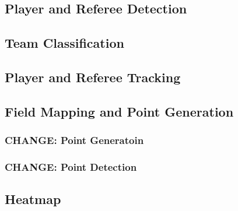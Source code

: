 \documentclass[12pt, letterpaper]{article}
\begin{document}
{
\setlength{\parskip}{0.3cm}
\subsection{Player and Referee Detection}
\begin{spacing}{1.2}

\end{spacing}
}

{
\setlength{\parskip}{0.3cm}
\subsection{Team Classification}
\begin{spacing}{1.2}

\end{spacing}
}

{
\setlength{\parskip}{0.3cm}
\subsection{Player and Referee Tracking}
\begin{spacing}{1.2}

\end{spacing}
}

{
\setlength{\parskip}{0.3cm}
\subsection{Field Mapping and Point Generation}
\begin{spacing}{1.2}

\subsubsection{\textbf{CHANGE}: Point Generatoin}

\subsubsection{\textbf{CHANGE}: Point Detection}

\end{spacing}
}


{
\setlength{\parskip}{0.3cm}
\subsection{Heatmap}
\begin{spacing}{1.2}

\end{spacing}
}
\end{document}
